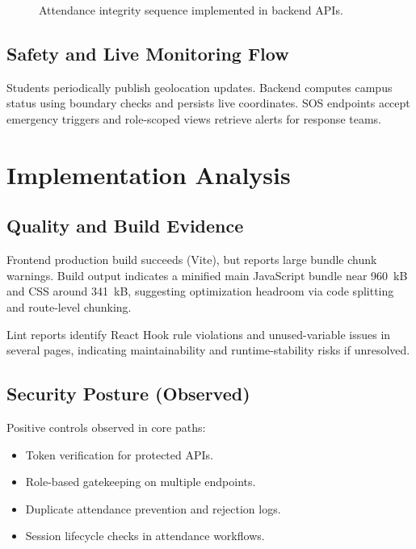 \documentclass[conference]{IEEEtran}
\begin{document}
\begin{figure}[htbp]
\centering
{}
\caption{Attendance integrity sequence implemented in backend APIs.}
\label{fig:attendance-seq}
\end{figure}

\subsection{Safety and Live Monitoring Flow}
Students periodically publish geolocation updates. Backend computes campus status using boundary checks and persists live coordinates. SOS endpoints accept emergency triggers and role-scoped views retrieve alerts for response teams.

\section{Implementation Analysis}
\subsection{Quality and Build Evidence}
Frontend production build succeeds (Vite), but reports large bundle chunk warnings. Build output indicates a minified main JavaScript bundle near 960~kB and CSS around 341~kB, suggesting optimization headroom via code splitting and route-level chunking.

Lint reports identify React Hook rule violations and unused-variable issues in several pages, indicating maintainability and runtime-stability risks if unresolved.

\subsection{Security Posture (Observed)}
Positive controls observed in core paths:
\begin{itemize}
    \item Token verification for protected APIs.
    \item Role-based gatekeeping on multiple endpoints.
    \item Duplicate attendance prevention and rejection logs.
    \item Session lifecycle checks in attendance workflows.
\end{itemize}
\end{document}
